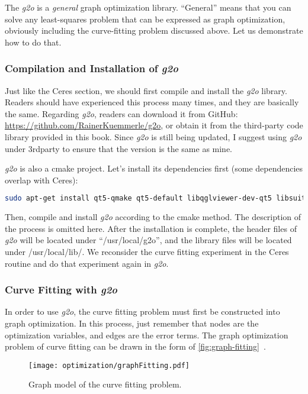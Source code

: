 The \textit{g2o} is a \textit{general} graph optimization library. ``General'' means that you can solve any least-squares problem that can be expressed as graph optimization, obviously including the curve-fitting problem discussed above. Let us demonstrate how to do that.

\subsubsection{Compilation and Installation of \textit{g2o}}
Just like the Ceres section, we should first compile and install the \textit{g2o} library. Readers should have experienced this process many times, and they are basically the same. Regarding \textit{g2o}, readers can download it from GitHub: \url{https://github.com/RainerKuemmerle/g2o}, or obtain it from the third-party code library provided in this book. Since \textit{g2o} is still being updated, I suggest using \textit{g2o} under 3rdparty to ensure that the version is the same as mine.

\textit{g2o} is also a cmake project. Let's install its dependencies first (some dependencies overlap with Ceres):
\begin{lstlisting}[language=sh,caption=Terminal input:]
    sudo apt-get install qt5-qmake qt5-default libqglviewer-dev-qt5 libsuitesparse-dev libcxsparse3 libcholmod3
\end{lstlisting}

Then, compile and install \textit{g2o} according to the cmake method. The description of the process is omitted here. After the installation is complete, the header files of \textit{g2o} will be located under ``/usr/local/g2o'', and the library files will be located under /usr/local/lib/. We reconsider the curve fitting experiment in the Ceres routine and do that experiment again in \textit{g2o}.

\subsubsection{Curve Fitting with \textit{g2o}}
In order to use \textit{g2o}, the curve fitting problem must first be constructed into graph optimization. In this process, just remember that nodes are the optimization variables, and edges are the error terms. The graph optimization problem of curve fitting can be drawn in the form of \autoref{fig:graph-fitting}~.

\begin{figure}[!ht]
    \centering
    \texttt{[image: optimization/graphFitting.pdf]}
    \caption{Graph model of the curve fitting problem. }
    \label{fig:graph-fitting}
\end{figure}

